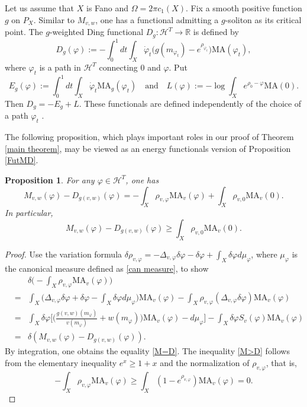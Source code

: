 \documentclass[12pt]{amsart}
\numberwithin{equation}{section}%
\theoremstyle{plain}
\newtheorem{proposition}[theorem]{Proposition}
\theoremstyle{definition}
\newcommand{\MA}{\mathrm{MA}}
\renewcommand{\phi}{\varphi}
\renewcommand{\geq}{\geqslant}
\newcommand{\1}{\mathbf{1}}
\begin{document}
Let us assume that $X$ is Fano and $\Omega=2\pi c_{1}(X)$.
Fix a smooth positive function $g$ on $P_{X}$.
Similar to $M_{v,w}$, one has a functional admitting a $g$-soliton
as its critical point.
The $g$-weighted Ding functional $D_{g}:\mathcal{H}^{T}\to\mathbb{R}$
is defined by
\begin{equation}
D_{g}(\phi):=-\int_{0}^{1}dt\int_{X}\dot{\phi}_{t}
\Big(g(m_{\phi_{t}})-e^{\rho_{\phi_{t}}}\Big)\MA(\phi_{t}),
\end{equation}
where $\phi_{t}$ is a path in $\mathcal{H}^{T}$ connecting $0$ and $\phi$.
Put
\begin{equation}\label{E and L}
E_{g}(\phi):=\int_{0}^{1}dt\int_{X}\dot{\phi}_{t}\MA_{g}(\phi_{t})
\quad\text{and}\quad
L(\phi):=-\log\int_{X}e^{\rho_{0}-\phi}\MA(0).
\end{equation}
Then $D_{g}=-E_{g}+L$.
These functionals are defined independently of the choice of a path $\phi_{t}$
\cite{BW14, HaLi20}.

The following proposition,
which plays important roles in our proof of Theorem \ref{main theorem},
may be viewed as an energy functionals version of Proposition \ref{FutMD}.
\begin{proposition}\label{comparison}
For any $\phi\in\mathcal{H}^{T}$, one has
\begin{equation}\label{M=D}
M_{v,w}(\phi)-D_{g(v,w)}(\phi)
=-\int_{X}\rho_{v,\phi}\MA_{v}(\phi)+\int_{X}\rho_{v,0}\MA_{v}(0).
\end{equation}
In particular, 
\begin{equation}\label{M>D}
M_{v,w}(\phi)-D_{g(v,w)}(\phi)\geq \int_{X}\rho_{v,0}\MA_{v}(0).
\end{equation}
\end{proposition}

\begin{proof}
Use the variation formula
$\delta\rho_{v,\phi}=-\Delta_{v,\phi}\delta\phi-\delta\phi+\int_{X}\delta\phi d\mu_{\phi}$,
where $\mu_{\phi}$ is the canonical measure defined as \eqref{can measure},
to show
\begin{eqnarray*}
&&\delta\Big(-\int_{X}\rho_{v,\phi}\MA_{v}(\phi)\Big)\\
&=&\int_{X}\Big(\Delta_{v,\phi}\delta\phi+\delta\phi-\int_{X}\delta\phi d\mu_{\phi}\Big)
\MA_{v}(\phi)
-\int_{X}\rho_{v,\phi}(\Delta_{v,\phi}\delta\phi)\MA_{v}(\phi) \\
&=&\int_{X}\delta\phi\Big[\Big(\frac{g(v,w)(m_{\phi})}{v(m_{\phi})}
+w(m_{\phi})\Big)\MA_{v}(\phi)-d\mu_{\phi}\Big]
-\int_{X}\delta\phi S_{v}(\phi)\MA_{v}(\phi) \\
&=& \delta\left( M_{v,w}(\phi)-D_{g(v,w)}(\phi) \right).
\end{eqnarray*}
By integration, one obtains the equality \eqref{M=D}.
The inequality \eqref{M>D} follows from
the elementary inequality $e^{x}\geq 1+x$ and the normalization of $\rho_{v,\phi}$,
that is,
\begin{equation}
-\int_{X}\rho_{v,\phi}\MA_{v}(\phi)\geq\int_{X}(1-e^{\rho_{v,\phi}})\MA_{v}(\phi)=0.
\end{equation}
\end{proof}
\end{document}
